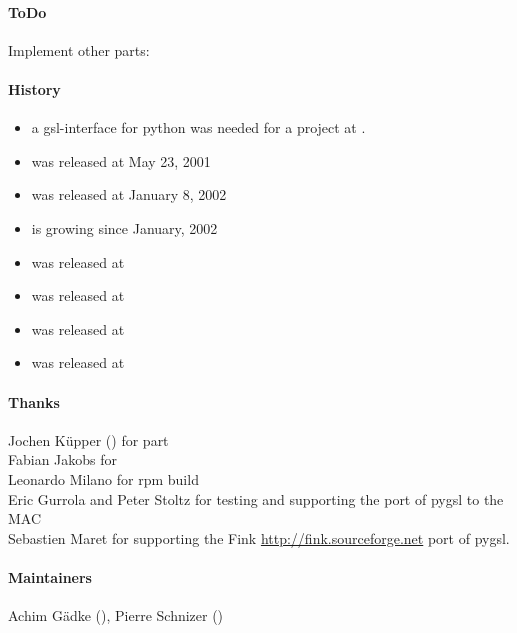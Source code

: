 \paragraph*{ToDo}
Implement other parts:


\paragraph*{History}
\begin{itemize}
\item a gsl-interface for python was needed for a project at
.
\item {} was released at May 23, 2001
\item {} was released at January 8, 2002
\item {} is growing since January, 2002
\item {} was released at 
\item {} was released at 
\item {} was released at 
\item {} was released at 
\end{itemize}

\paragraph*{Thanks}
Jochen K\"upper () for  part\\
Fabian Jakobs for 
 \\ 
Leonardo Milano for rpm build\\
Eric Gurrola and  Peter Stoltz for testing and supporting the port of pygsl to
the MAC\\
Sebastien Maret for supporting the Fink \url{http://fink.sourceforge.net} port of
pygsl.


\paragraph*{Maintainers}
Achim G\"adke (),
Pierre Schnizer ()
